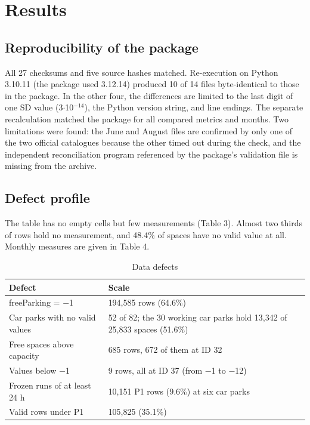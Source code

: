\documentclass[default]{subfiles}
\begin{document}
{\section{Results}

\subsection{Reproducibility of the package}

All 27 checksums and five source hashes matched. Re-execution on Python 3.10.11 (the package used 3.12.14) produced 10 of 14 files byte-identical to those in the package. In the other four, the differences are limited to the last digit of one SD value (3$\cdot$10$^{-14}$), the Python version string, and line endings. The separate recalculation matched the package for all compared metrics and months. Two limitations were found: the June and August files are confirmed by only one of the two official catalogues because the other timed out during the check, and the independent reconciliation program referenced by the package's validation file is missing from the archive.

\subsection{Defect profile}

The table has no empty cells but few measurements (Table 3). Almost two thirds of rows hold no measurement, and 48.4\% of spaces have no valid value at all. Monthly measures are given in Table 4.

\begin{table}[htbp]
  \caption{Data defects}
  \label{tab:3}
  \centering\small
  \begin{tabular}{p{}p{}}
    \hline
    \textbf{Defect} & \textbf{Scale} \\ \hline
    freeParking = $-$1 & 194,585 rows (64.6\%) \\
    Car parks with no valid values & 52 of 82; the 30 working car parks hold 13,342 of 25,833 spaces (51.6\%) \\
    Free spaces above capacity & 685 rows, 672 of them at ID 32 \\
    Values below $-$1 & 9 rows, all at ID 37 (from $-$1 to $-$12) \\
    Frozen runs of at least 24 h & 10,151 P1 rows (9.6\%) at six car parks \\
    Valid rows under P1 & 105,825 (35.1\%) \\
    \hline
  \end{tabular}
\end{table}

}
\end{document}
